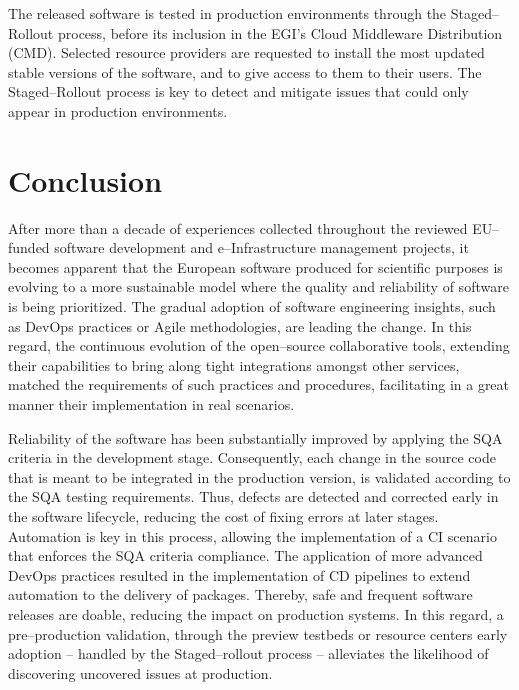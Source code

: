 \documentclass[journal]{IEEEtran}
\begin{document}
The released software is tested in production environments through the
Staged--Rollout process, before its inclusion in the EGI's Cloud Middleware Distribution (CMD).
Selected resource providers are requested to install
the most updated stable versions of the software, and to give access to them to their users. The
Staged--Rollout process is key to detect and mitigate issues that could only
appear in production environments.

\section{Conclusion}
\label{sec:con}

After more than a decade of experiences collected throughout the reviewed
EU--funded software development and e--Infrastructure management projects, it
becomes apparent that the European software produced for scientific purposes is
evolving to a more sustainable model where the quality and reliability of
software is being prioritized. The gradual adoption of software engineering insights, such as
DevOps practices or Agile methodologies, are leading the change. In this regard, the continuous evolution of the open--source
collaborative tools, extending their capabilities to bring along tight
integrations amongst other services, matched the requirements of such practices
and procedures, facilitating in a great manner their implementation in real scenarios.

Reliability of the software has been substantially improved by applying the SQA
criteria in the development stage. Consequently, each change in the source code
that is meant to be integrated in the production version, is validated according
to the SQA testing requirements. Thus, defects are detected and corrected early in the
software lifecycle, reducing the cost of fixing errors at later stages. Automation is
key in this process, allowing the implementation of a CI scenario that enforces
the SQA criteria compliance. The application of more advanced DevOps practices
resulted in the implementation of CD pipelines to extend automation to the
delivery of packages. Thereby, safe and frequent software releases are doable, reducing
the impact on production systems. In this regard, a pre--production validation,
through the preview testbeds or resource centers early adoption -- handled by the
Staged--rollout process -- alleviates the likelihood of discovering uncovered
issues at production.
\end{document}
